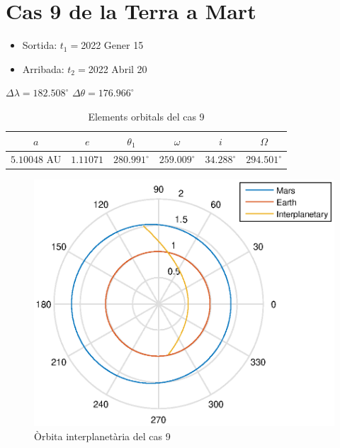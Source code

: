 \section{Cas 9 de la Terra a Mart}
\begin{itemize}
	\item Sortida: $t_{1}=$2022 Gener 15
	\item Arribada: $t_{2}=$2022 Abril 20
\end{itemize}
$\Delta\lambda=182.508^{\circ}$
$\Delta\theta=176.966^{\circ}$
\begin{table}[h!]
	\centering
	\begin{tabular}{ |c|c|c|c|c|c|}
		\hline
		$a$ & $e$ & $\theta_{1}$ & $\omega$ & $i$ & $\Omega$ \\ \hline
		$5.10048$ AU  & $1.11071$ & $280.991^{\circ}$ & $259.009^{\circ}$ & $34.288^{\circ}$ & $294.501^{\circ}$ \\ \hline
	\end{tabular}
	\caption{Elements orbitals del cas 9}
\end{table}
\begin{figure}[H]
	\centering
	\includegraphics[scale=0.95]{./plots/cas9}
	\caption{Òrbita interplanetària del cas 9}
\end{figure}